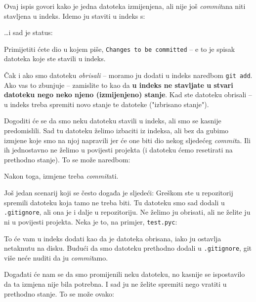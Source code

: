 

Ovaj ispis govori kako je jedna datoteka izmijenjena, ali nije još \emph{commit}ana niti stavljena u indeks.
Idemo ju staviti u indeks s:


\dots{}i sad je status:



Primijetiti ćete dio u kojem piše, \texttt{Changes to be committed} -- e to je spisak datoteka koje ste stavili u indeks.

Čak i ako smo datoteku \emph{obrisali} -- moramo ju dodati u indeks naredbom \verb+git add+.
Ako vas to zbunjuje -- zamislite to kao da \textbf{u indeks ne stavljate u stvari datoteku nego neko njeno (izmijenjeno) stanje}.
Kad ste datoteku obrisali -- u indeks treba spremiti novo stanje te datoteke ("izbrisano stanje").

Dogoditi će se da smo neku datoteku stavili u indeks, ali smo se kasnije predomislili. 
Sad tu datoteku želimo izbaciti iz indeksa, ali bez da gubimo izmjene koje smo na njoj napravili jer će one biti dio nekog sljedećeg \emph{commit}a.
Ili ih jednostavno ne želimo u povijesti projekta (i datoteku ćemo resetirati na prethodno stanje).
To se može naredbom:


Nakon toga, izmjene treba \emph{commit}ati.

Još jedan scenarij koji se često događa je sljedeći:
Greškom ste u repozitorij spremili datoteku koja tamo ne treba biti. 
Tu datoteku smo sad dodali u \verb+.gitignore+, ali ona je i dalje u repozitoriju.
Ne želimo ju obrisati, ali ne želite ju ni u povijesti projekta.
Neka je to, na primjer, \verb+test.pyc+:


To će vam u indeks dodati kao da je datoteka obrisana, iako ju ostavlja netaknutu na disku.
Budući da smo datoteku prethodno dodali u \verb+.gitignore+, git više neće nuditi da ju \emph{commit}amo.

Događati će nam se da smo promijenili neku datoteku, no kasnije se ispostavilo da ta izmjena nije bila potrebna. 
I sad ju ne želite spremiti nego vratiti u prethodno stanje.
To se može ovako:


